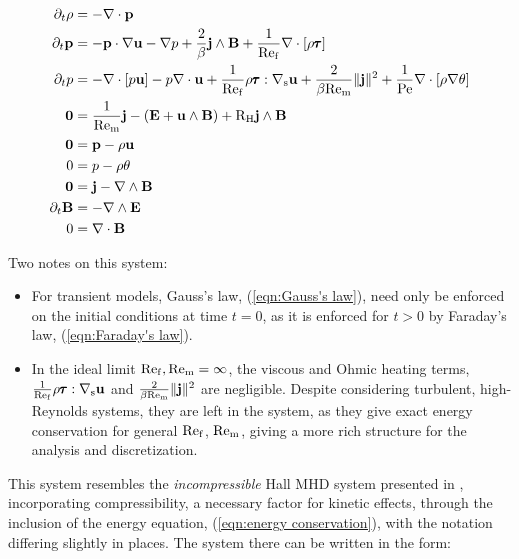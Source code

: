     \begin{align}
        \partial_{t}\rho  &=  - \nabla\cdot\mathbf{p}  \label{eqn:mass conservation}  \\
        \partial_{t}\mathbf{p}  &=  - \mathbf{p}\cdot\nabla\mathbf{u} - \nabla p + \frac{2}{\beta}\mathbf{j}\wedge\mathbf{B} + \frac{1}{\mathrm{Re}_{\mathrm{f}}}\nabla\cdot[\rho\pmb{\mathsf{\tau}}]  \label{eqn:momentum conservation}  \\
        \partial_{t}p  &=  - \nabla\cdot[p\mathbf{u}] - p\nabla\cdot\mathbf{u} + \frac{1}{\mathrm{Re}_{\mathrm{f}}}\rho\pmb{\mathsf{\tau}}:\nabla_{\mathrm{s}}\mathbf{u} + \frac{2}{\beta\mathrm{Re}_{\mathrm{m}}}\|\mathbf{j}\|^{2} + \frac{1}{\mathrm{Pe}}\nabla\cdot[\rho\nabla\theta]  \label{eqn:energy conservation}  \\
        \mathbf{0}  &=  \frac{1}{\mathrm{Re}_{\mathrm{m}}}\mathbf{j} - \left(\mathbf{E} + \mathbf{u}\wedge\mathbf{B}\right) + \mathrm{R}_{\mathrm{H}}\mathbf{j}\wedge\mathbf{B}  \label{eqn:current identity}  \\
        \mathbf{0}  &=  \mathbf{p} - \rho\mathbf{u}  \label{eqn:velocity identity}  \\
        0  &=  p - \rho\theta  \label{eqn:temperature identity}  \\
        \mathbf{0}  &=  \mathbf{j} - \nabla\wedge\mathbf{B}  \label{eqn:Ampère's law}  \\
        \partial_{t}\mathbf{B}  &=  - \nabla\wedge\mathbf{E}  \label{eqn:Faraday's law}  \\
        0  &=  \nabla\cdot\mathbf{B}  \label{eqn:Gauss's law}
    \end{align}

    \line

    Two notes on this system:
    \begin{itemize}
        \item  For transient models, Gauss's law, (\ref{eqn:Gauss's law}), need only be enforced on the initial conditions at time $t  =  0$, as it is enforced for $t  >  0$ by Faraday's law, (\ref{eqn:Faraday's law}).

        \item  In the ideal limit $\mathrm{Re}_{\mathrm{f}}, \mathrm{Re}_{\mathrm{m}}  =  \infty$, the viscous and Ohmic heating terms, $\frac{1}{\mathrm{Re}_{\mathrm{f}}}\rho\pmb{\mathsf{\tau}}:\nabla_{\mathrm{s}}\mathbf{u}$ and $\frac{2}{\beta\mathrm{Re}_{\mathrm{m}}}\|\mathbf{j}\|^{2}$ are negligible. Despite considering turbulent, high-Reynolds systems, they are left in the system, as they give exact energy conservation for general $\mathrm{Re}_{\mathrm{f}}$, $\mathrm{Re}_{\mathrm{m}}$, giving a more rich structure for the analysis and discretization. 
    \end{itemize}

    This system resembles the \emph{incompressible} Hall MHD system presented in \cite{LHF22}, incorporating compressibility, a necessary factor for kinetic effects, through the inclusion of the energy equation, (\ref{eqn:energy conservation}), with the notation differing slightly in places. The system there can be written in the form:
    
